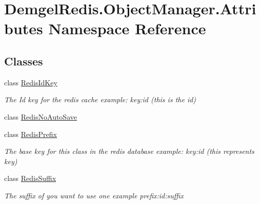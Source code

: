 \hypertarget{namespace_demgel_redis_1_1_object_manager_1_1_attributes}{}\section{Demgel\+Redis.\+Object\+Manager.\+Attributes Namespace Reference}
\label{namespace_demgel_redis_1_1_object_manager_1_1_attributes}
\subsection*{Classes}
\begin{DoxyCompactItemize}
\item 
class \hyperlink{class_demgel_redis_1_1_object_manager_1_1_attributes_1_1_redis_id_key}{Redis\+Id\+Key}
\begin{DoxyCompactList}\small\item\em The Id key for the redis cache example\+: key\+:id (this is the id) \end{DoxyCompactList}\item 
class \hyperlink{class_demgel_redis_1_1_object_manager_1_1_attributes_1_1_redis_no_auto_save}{Redis\+No\+Auto\+Save}
\item 
class \hyperlink{class_demgel_redis_1_1_object_manager_1_1_attributes_1_1_redis_prefix}{Redis\+Prefix}
\begin{DoxyCompactList}\small\item\em The base key for this class in the redis database example\+: key\+:id (this represents key) \end{DoxyCompactList}\item 
class \hyperlink{class_demgel_redis_1_1_object_manager_1_1_attributes_1_1_redis_suffix}{Redis\+Suffix}
\begin{DoxyCompactList}\small\item\em The suffix of you want to use one example prefix\+:id\+:suffix \end{DoxyCompactList}\end{DoxyCompactItemize}
